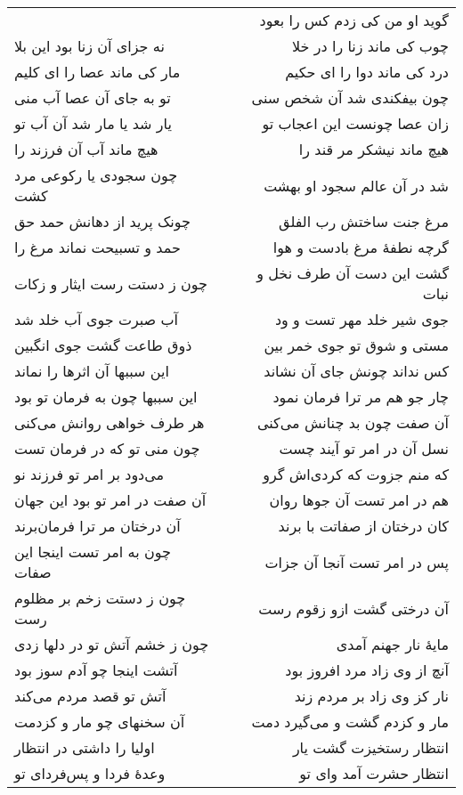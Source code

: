 \begin{center}
\begin{longtable}{l p{0.5cm} r}
&&
گوید او من کی زدم کس را بعود
\\
نه جزای آن زنا بود این بلا
&&
چوب کی ماند زنا را در خلا
\\
مار کی ماند عصا را ای کلیم
&&
درد کی ماند دوا را ای حکیم
\\
تو به جای آن عصا آب منی
&&
چون بیفکندی شد آن شخص سنی
\\
یار شد یا مار شد آن آب تو
&&
زان عصا چونست این اعجاب تو
\\
هیچ ماند آب آن فرزند را
&&
هیچ ماند نیشکر مر قند را
\\
چون سجودی یا رکوعی مرد کشت
&&
شد در آن عالم سجود او بهشت
\\
چونک پرید از دهانش حمد حق
&&
مرغ جنت ساختش رب الفلق
\\
حمد و تسبیحت نماند مرغ را
&&
گرچه نطفهٔ مرغ بادست و هوا
\\
چون ز دستت رست ایثار و زکات
&&
گشت این دست آن طرف نخل و نبات
\\
آب صبرت جوی آب خلد شد
&&
جوی شیر خلد مهر تست و ود
\\
ذوق طاعت گشت جوی انگبین
&&
مستی و شوق تو جوی خمر بین
\\
این سببها آن اثرها را نماند
&&
کس نداند چونش جای آن نشاند
\\
این سببها چون به فرمان تو بود
&&
چار جو هم مر ترا فرمان نمود
\\
هر طرف خواهی روانش می‌کنی
&&
آن صفت چون بد چنانش می‌کنی
\\
چون منی تو که در فرمان تست
&&
نسل آن در امر تو آیند چست
\\
می‌دود بر امر تو فرزند نو
&&
که منم جزوت که کردی‌اش گرو
\\
آن صفت در امر تو بود این جهان
&&
هم در امر تست آن جوها روان
\\
آن درختان مر ترا فرمان‌برند
&&
کان درختان از صفاتت با برند
\\
چون به امر تست اینجا این صفات
&&
پس در امر تست آنجا آن جزات
\\
چون ز دستت زخم بر مظلوم رست
&&
آن درختی گشت ازو زقوم رست
\\
چون ز خشم آتش تو در دلها زدی
&&
مایهٔ نار جهنم آمدی
\\
آتشت اینجا چو آدم سوز بود
&&
آنچ از وی زاد مرد افروز بود
\\
آتش تو قصد مردم می‌کند
&&
نار کز وی زاد بر مردم زند
\\
آن سخنهای چو مار و کزدمت
&&
مار و کزدم گشت و می‌گیرد دمت
\\
اولیا را داشتی در انتظار
&&
انتظار رستخیزت گشت یار
\\
وعدهٔ فردا و پس‌فردای تو
&&
انتظار حشرت آمد وای تو
\\

\end{longtable}
\end{center}
